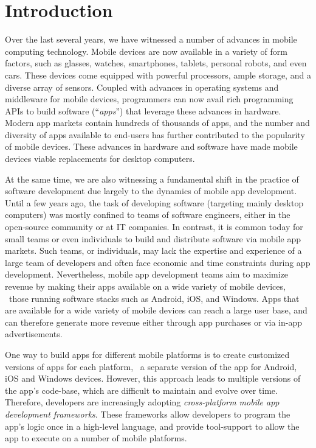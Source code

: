 \section{Introduction}
\label{section:introduction}

Over the last several years, we have witnessed a number of advances in mobile
computing technology. Mobile devices are now available in a variety of form
factors, such as glasses, watches, smartphones, tablets, personal robots, and
even cars. These devices come equipped with powerful processors, ample storage,
and a diverse array of sensors. Coupled with advances in operating systems and
middleware for mobile devices, programmers can now avail rich programming APIs
to build software (``\textit{apps}'') that leverage these advances in hardware.
Modern app markets contain hundreds of thousands of apps, and the number and
diversity of apps available to end-users has further contributed to the
popularity of mobile devices. These advances in hardware and software have made
mobile devices viable replacements for desktop computers.

At the same time, we are also witnessing a fundamental shift in the practice of
software development due largely to the dynamics of mobile app development.
Until a few years ago, the task of developing software (targeting mainly
desktop computers) was mostly confined to teams of software engineers, either
in the open-source community or at IT companies. In contrast, it is common
today for small teams or even individuals to build and distribute software via
mobile app markets. Such teams, or individuals, may lack the expertise and
experience of a large team of developers and often face economic and time
constraints during app development.  Nevertheless, mobile app development teams
aim to maximize revenue by making their apps available on a wide variety of
mobile devices, \ie~those running software stacks such as Android, iOS, and
Windows. Apps that are available for a wide variety of mobile devices can reach
a large user base, and can therefore generate more revenue either through app
purchases or via in-app advertisements.

One way to build apps for different mobile platforms is to create customized
versions of apps for each platform, \eg~a separate version of the app for
Android, iOS and Windows devices. However, this approach leads to multiple
versions of the app's code-base, which are difficult to maintain and evolve
over time. 
%
% 
%
Therefore, developers are increasingly adopting \textit{cross-platform mobile
app development frameworks}. These frameworks allow developers to program the
app's logic once in a high-level language, and provide tool-support to allow
the app to execute on a number of mobile platforms. 

